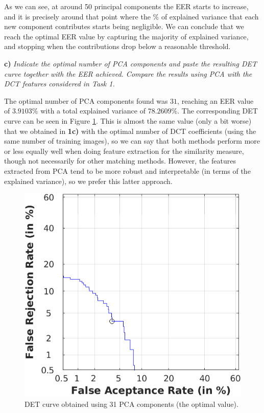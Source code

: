 \documentclass[11pt]{article}
\begin{document}
As we can see, at around 50 principal components the EER starts to increase, and it is precisely around that point where the $\%$ of explained variance that each new component contributes starts being negligible. We can conclude that we reach the optimal EER value by capturing the majority of explained variance, and stopping when the contributions drop below a reasonable threshold.

\textbf{c)} \textit{Indicate the optimal number of PCA components and paste the resulting DET curve together with the EER achieved. Compare the results using PCA with the DCT features considered in Task 1.}

The optimal number of PCA components found was $31$, reaching an EER value of $3.9103\%$ with a total explained variance of $78.2609\%$. The corresponding DET curve can be seen in Figure \ref{fig:ex2c}. This is almost the same value (only a bit worse) that we obtained in \textbf{1c)} with the optimal number of DCT coefficients (using the same number of training images), so we can say that both methods perform more or less equally well when doing feature extraction for the similarity measure, though not necessarily for other matching methods. However, the features extracted from PCA tend to be more robust and interpretable (in terms of the explained variance), so we prefer this latter approach.

\begin{figure}[h!]
  \centering
    \includegraphics[scale=0.75]{img/2c_det}
    \caption{DET curve obtained using 31 PCA components (the optimal value).}
    \label{fig:ex2c}
\end{figure}
\end{document}
